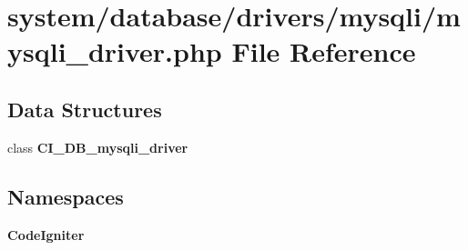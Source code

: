 \section{system/database/drivers/mysqli/mysqli\-\_\-driver.php File Reference}
\label{mysqli__driver_8php}
\subsection*{Data Structures}
\begin{DoxyCompactItemize}
\item 
class {\bf C\-I\-\_\-\-D\-B\-\_\-mysqli\-\_\-driver}
\end{DoxyCompactItemize}
\subsection*{Namespaces}
\begin{DoxyCompactItemize}
\item 
{\bf Code\-Igniter}
\end{DoxyCompactItemize}
